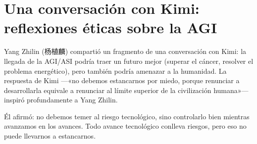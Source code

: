 \section{Una conversación con Kimi: reflexiones éticas sobre la AGI}

Yang Zhilin (杨植麟) compartió un fragmento de una conversación con Kimi: la llegada de la AGI/ASI podría traer un futuro mejor (superar el cáncer, resolver el problema energético), pero también podría amenazar a la humanidad. La respuesta de Kimi —«no debemos estancarnos por miedo, porque renunciar a desarrollarla equivale a renunciar al límite superior de la civilización humana»— inspiró profundamente a Yang Zhilin.

Él afirmó: no debemos temer al riesgo tecnológico, sino controlarlo bien mientras avanzamos en los avances. Todo avance tecnológico conlleva riesgos, pero eso no puede llevarnos a estancarnos.


